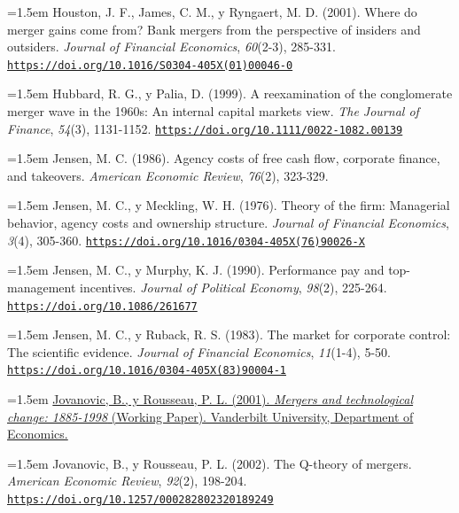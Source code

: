 \documentclass[10pt,a4paper]{article}
\begin{document}
\noindent\hangindent=1.5em Houston, J. F., James, C. M., y Ryngaert, M. D. (2001). Where do merger gains come from? Bank mergers from the perspective of insiders and outsiders. \textit{Journal of Financial Economics}, \textit{60}(2-3), 285-331. \href{https://doi.org/10.1016/S0304-405X(01)00046-0}{\nolinkurl{https://doi.org/10.1016/S0304-405X(01)00046-0}}

\noindent\hangindent=1.5em Hubbard, R. G., y Palia, D. (1999). A reexamination of the conglomerate merger wave in the 1960s: An internal capital markets view. \textit{The Journal of Finance}, \textit{54}(3), 1131-1152. \href{https://doi.org/10.1111/0022-1082.00139}{\nolinkurl{https://doi.org/10.1111/0022-1082.00139}}

\noindent\hangindent=1.5em Jensen, M. C. (1986). Agency costs of free cash flow, corporate finance, and takeovers. \textit{American Economic Review}, \textit{76}(2), 323-329.

\noindent\hangindent=1.5em Jensen, M. C., y Meckling, W. H. (1976). Theory of the firm: Managerial behavior, agency costs and ownership structure. \textit{Journal of Financial Economics}, \textit{3}(4), 305-360. \href{https://doi.org/10.1016/0304-405X(76)90026-X}{\nolinkurl{https://doi.org/10.1016/0304-405X(76)90026-X}}

\noindent\hangindent=1.5em Jensen, M. C., y Murphy, K. J. (1990). Performance pay and top-management incentives. \textit{Journal of Political Economy}, \textit{98}(2), 225-264. \href{https://doi.org/10.1086/261677}{\nolinkurl{https://doi.org/10.1086/261677}}

\noindent\hangindent=1.5em Jensen, M. C., y Ruback, R. S. (1983). The market for corporate control: The scientific evidence. \textit{Journal of Financial Economics}, \textit{11}(1-4), 5-50. \href{https://doi.org/10.1016/0304-405X(83)90004-1}{\nolinkurl{https://doi.org/10.1016/0304-405X(83)90004-1}}

\noindent\hangindent=1.5em \href{https://hdl.handle.net/1803/15676}{Jovanovic, B., y Rousseau, P. L. (2001). \textit{Mergers and technological change: 1885-1998} (Working Paper). Vanderbilt University, Department of Economics.}

\noindent\hangindent=1.5em Jovanovic, B., y Rousseau, P. L. (2002). The Q-theory of mergers. \textit{American Economic Review}, \textit{92}(2), 198-204. \href{https://doi.org/10.1257/000282802320189249}{\nolinkurl{https://doi.org/10.1257/000282802320189249}}
\end{document}
